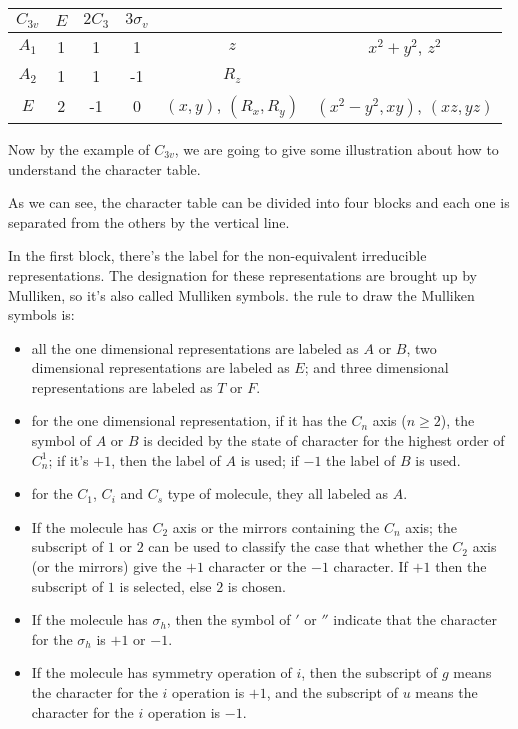 \begin{center}
  \begin{tabular}{c|c c c|c|c}
    $C_{3v}$ & $E$ & $2C_{3}$ & $3\sigma_{v}$ &                          &    \\
    \hline
    $A_{1} $ & 1   &     1    &      1        & $z$                      &
    $x^{2}+y^{2}$, $z^{2}$ \\
    $A_{2} $ & 1   &     1    &     -1        & $R_{z}$                  &    \\
    $E$      & 2   &    -1    &      0        & $(x,y)$, $(R_{x},R_{y})$ &
    $(x^{2}-y^{2}, xy)$, $(xz, yz)$ \\
  \end{tabular}
\end{center}

Now by the example of $C_{3v}$, we are going to give some illustration
about how to understand the character table.

As we can see, the character table can be divided into four blocks and
each one is separated from the others by the vertical line.

In the first block, there's the label for the non-equivalent
irreducible representations. The designation for these representations
are brought up by Mulliken, so it's also called Mulliken symbols. the
rule to draw the Mulliken symbols is:
\begin{itemize}
\item all the one dimensional representations are labeled as $A$ or
  $B$, two dimensional representations are labeled as $E$; and three
  dimensional representations are labeled as $T$ or $F$.
\item for the one dimensional representation, if it has the $C_{n}$
  axis ($n \geq 2$), the symbol of $A$ or $B$ is decided by the state
  of character for the highest order of $C^{1}_{n}$; if it's $+1$,
  then the label of $A$ is used; if $-1$ the label of $B$ is used.
\item for the $C_{1}$, $C_{i}$ and $C_{s}$ type of molecule, they all
  labeled as $A$.
\item If the molecule has $C_{2}$ axis or the mirrors containing the
  $C_{n}$ axis; the subscript of $1$ or $2$ can be used to classify
  the case that whether the $C_{2}$ axis (or the mirrors) give the
  $+1$ character or the $-1$ character. If $+1$ then the subscript of
  $1$ is selected, else $2$ is chosen.
\item If the molecule has $\sigma_{h}$, then the symbol of $'$ or $''$
  indicate that the character for the $\sigma_{h}$ is $+1$ or $-1$.
\item If the molecule has symmetry operation of $i$, then the
  subscript of $g$ means the character for the $i$ operation is $+1$,
  and the subscript of $u$ means the character for the $i$ operation
  is $-1$.
\end{itemize}

